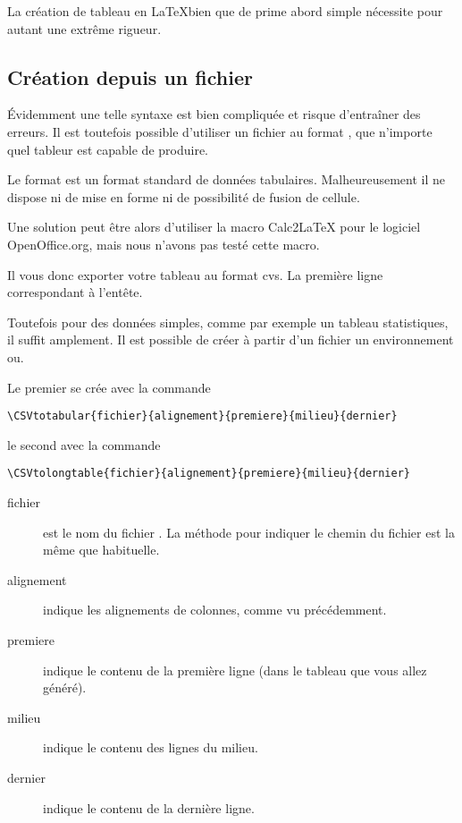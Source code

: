 \begin{description}
La création de tableau en \LaTeX bien que de prime abord simple nécessite pour autant une extrême rigueur.

\subsection{Création depuis un fichier }

Évidemment une telle syntaxe est bien compliquée et risque d'entraîner des erreurs. Il est toutefois possible d'utiliser un fichier au format , que n'importe quel tableur est capable de produire.

Le format  est un format standard de données tabulaires. Malheureusement il ne dispose ni de mise en forme ni de possibilité de fusion de cellule.

\begin{anedocte}Une solution peut être alors d'utiliser la macro Calc2LaTeX pour le logiciel OpenOffice.org, mais nous n'avons pas testé cette macro.
\end{anedocte}

Il vous donc exporter votre tableau au format cvs. La première ligne correspondant à l'entête.

Toutefois pour des données simples, comme par exemple un tableau statistiques, il suffit amplement. Il est possible de créer à partir d'un fichier  un environnement  ou.

Le premier se crée  avec la commande

\begin{verbatim}
\CSVtotabular{fichier}{alignement}{premiere}{milieu}{dernier}
\end{verbatim}

le second avec la commande

\begin{verbatim}
\CSVtolongtable{fichier}{alignement}{premiere}{milieu}{dernier}
\end{verbatim}

\begin{description}
\item[fichier]est le nom du fichier . La méthode pour indiquer le chemin du fichier est la même que habituelle.
\item[alignement] indique les alignements de colonnes, comme vu précédemment.
\item[premiere] indique le contenu de la première ligne (dans le tableau que vous allez généré).
\item[milieu] indique le contenu des lignes du milieu.
\item[dernier] indique le contenu de la dernière ligne.
\end{description}


\end{description}
